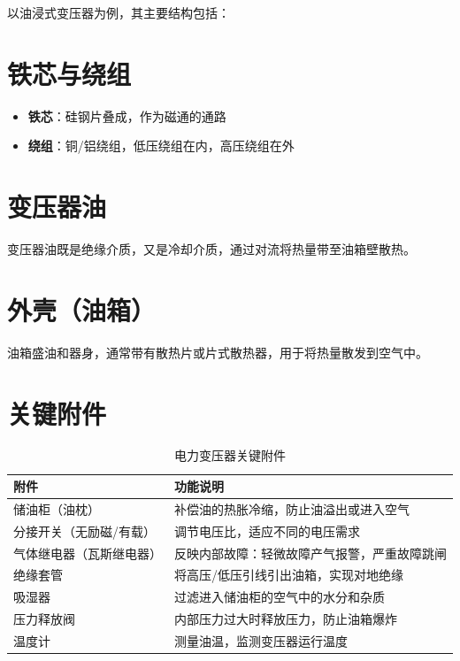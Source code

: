 \documentclass[12pt,UTF8]{ctexbook}
\begin{document}
以油浸式变压器为例，其主要结构包括：

\section{铁芯与绕组}

\begin{itemize}
    \item \textbf{铁芯}：硅钢片叠成，作为磁通的通路
    \item \textbf{绕组}：铜/铝绕组，低压绕组在内，高压绕组在外
\end{itemize}

\section{变压器油}

变压器油既是绝缘介质，又是冷却介质，通过对流将热量带至油箱壁散热。

\section{外壳（油箱）}

油箱盛油和器身，通常带有散热片或片式散热器，用于将热量散发到空气中。

\section{关键附件}

\begin{table}[htbp]
\centering
\caption{电力变压器关键附件}
\begin{tabular}{|p{4cm}|p{8cm}|}
\hline
\textbf{附件} & \textbf{功能说明} \\
\hline
储油柜（油枕） & 补偿油的热胀冷缩，防止油溢出或进入空气 \\
\hline
分接开关（无励磁/有载） & 调节电压比，适应不同的电压需求 \\
\hline
气体继电器（瓦斯继电器） & 反映内部故障：轻微故障产气报警，严重故障跳闸 \\
\hline
绝缘套管 & 将高压/低压引线引出油箱，实现对地绝缘 \\
\hline
吸湿器 & 过滤进入储油柜的空气中的水分和杂质 \\
\hline
压力释放阀 & 内部压力过大时释放压力，防止油箱爆炸 \\
\hline
温度计 & 测量油温，监测变压器运行温度 \\
\hline
\end{tabular}
\end{table}
\end{document}
